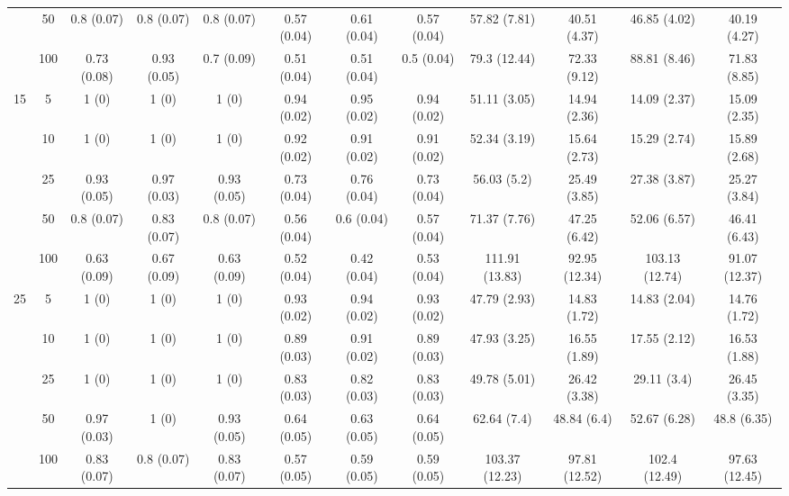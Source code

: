 \documentclass[11pt]{article}
\theoremstyle{definition}
\begin{document}
\begin{landscape}
\begin{table}[b]
\begin{center}
{\begin{tabular}{cc|ccc|ccc|cccc|}
    & 50  & 0.8 (0.07) & 0.8 (0.07) & 0.8 (0.07) & 0.57 (0.04) & 0.61 (0.04) & 0.57 (0.04) & 57.82 (7.81) & 40.51 (4.37) & 46.85 (4.02) & 40.19 (4.27) \\ 
    & 100  & 0.73 (0.08) & 0.93 (0.05) & 0.7 (0.09) & 0.51 (0.04) & 0.51 (0.04) & 0.5 (0.04) & 79.3 (12.44) & 72.33 (9.12) & 88.81 (8.46) & 71.83 (8.85) \\[.3cm] 
   \multirow{5}{*}{15} & 5  & 1 (0) & 1 (0) & 1 (0) & 0.94 (0.02) & 0.95 (0.02) & 0.94 (0.02) & 51.11 (3.05) & 14.94 (2.36) & 14.09 (2.37) & 15.09 (2.35) \\ 
    & 10  & 1 (0) & 1 (0) & 1 (0) & 0.92 (0.02) & 0.91 (0.02) & 0.91 (0.02) & 52.34 (3.19) & 15.64 (2.73) & 15.29 (2.74) & 15.89 (2.68) \\ 
    & 25  & 0.93 (0.05) & 0.97 (0.03) & 0.93 (0.05) & 0.73 (0.04) & 0.76 (0.04) & 0.73 (0.04) & 56.03 (5.2) & 25.49 (3.85) & 27.38 (3.87) & 25.27 (3.84) \\ 
    & 50  & 0.8 (0.07) & 0.83 (0.07) & 0.8 (0.07) & 0.56 (0.04) & 0.6 (0.04) & 0.57 (0.04) & 71.37 (7.76) & 47.25 (6.42) & 52.06 (6.57) & 46.41 (6.43) \\ 
    & 100  & 0.63 (0.09) & 0.67 (0.09) & 0.63 (0.09) & 0.52 (0.04) & 0.42 (0.04) & 0.53 (0.04) & 111.91 (13.83) & 92.95 (12.34) & 103.13 (12.74) & 91.07 (12.37) \\[.3cm] 
   \multirow{5}{*}{25} & 5  & 1 (0) & 1 (0) & 1 (0) & 0.93 (0.02) & 0.94 (0.02) & 0.93 (0.02) & 47.79 (2.93) & 14.83 (1.72) & 14.83 (2.04) & 14.76 (1.72) \\ 
    & 10  & 1 (0) & 1 (0) & 1 (0) & 0.89 (0.03) & 0.91 (0.02) & 0.89 (0.03) & 47.93 (3.25) & 16.55 (1.89) & 17.55 (2.12) & 16.53 (1.88) \\ 
    & 25  & 1 (0) & 1 (0) & 1 (0) & 0.83 (0.03) & 0.82 (0.03) & 0.83 (0.03) & 49.78 (5.01) & 26.42 (3.38) & 29.11 (3.4) & 26.45 (3.35) \\ 
    & 50  & 0.97 (0.03) & 1 (0) & 0.93 (0.05) & 0.64 (0.05) & 0.63 (0.05) & 0.64 (0.05) & 62.64 (7.4) & 48.84 (6.4) & 52.67 (6.28) & 48.8 (6.35) \\ 
    & 100  & 0.83 (0.07) & 0.8 (0.07) & 0.83 (0.07) & 0.57 (0.05) & 0.59 (0.05) & 0.59 (0.05) & 103.37 (12.23) & 97.81 (12.52) & 102.4 (12.49) & 97.63 (12.45) \\
\end{tabular}}
   \end{center}
\end{table}
\end{landscape}
\end{document}

